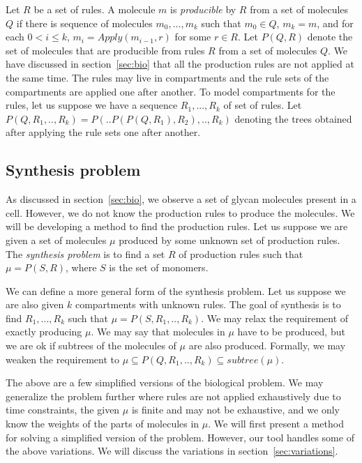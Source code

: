 Let $R$ be a set of rules.
A molecule $m$ is {\em producible} by $R$ from a set of molecules $Q$
if there is sequence of molecules $m_0,...,m_k$
such that $m_0 \in Q$, $m_k=m$, and
for each $0<i\leq k$, $m_{i} = Apply(m_{i-1},r)$ for some $r \in R$.
Let $P(Q,R)$ denote the set of molecules that are producible from
rules $R$ from a set of molecules $Q$.
We have discussed in section~\ref{sec:bio} that all the production rules
are not applied at the same time.
The rules may live in compartments and
the rule sets of the compartments are applied one after another.
To model compartments for the rules,
let us suppose we have a sequence $R_1,...,R_k$ of set of rules.
Let $P(Q, R_1,..,R_k) = P(..P(P(Q,R_1),R_2),..,R_k)$ denoting the
trees obtained after applying the rule sets one after another.


\subsection{Synthesis problem}
As discussed in section~\ref{sec:bio},
we observe a set of glycan molecules present in a cell.
%
However, we do not know the production rules to produce the molecules.
%
We will be developing a method to find the production rules.
%
Let us suppose we are given a set of molecules $\mu$ produced by some
unknown set of production rules.
%
The {\em synthesis problem} is to find a set $R$ of production rules
such that $\mu = P(S,R)$,
where $S$ is the set of monomers.

%
We can define a more general form of the synthesis problem.
Let us suppose we are also given $k$ compartments with unknown rules.
The goal of synthesis is to find  $R_1,...,R_k$ such that
$\mu = P(S, R_1,..,R_k)$.
We may relax the requirement of exactly producing $\mu$.
We may say that molecules in $\mu$ have to be produced, but we are ok
if subtrees of the molecules of $\mu$ are also produced.
Formally, we may weaken the requirement to $\mu \subseteq P(Q, R_1,..,R_k) \subseteq subtree(\mu)$.

The above are a few simplified versions of the biological problem.
We may generalize the problem further where
rules are not applied exhaustively due to time constraints,
the given $\mu$ is finite and may not be exhaustive,
and we only know the weights of the parts of molecules in $\mu$.
We will first present a method for solving a simplified version of the problem.
However, our tool handles some of the above variations.
We will discuss the variations in section~\ref{sec:variations}.


